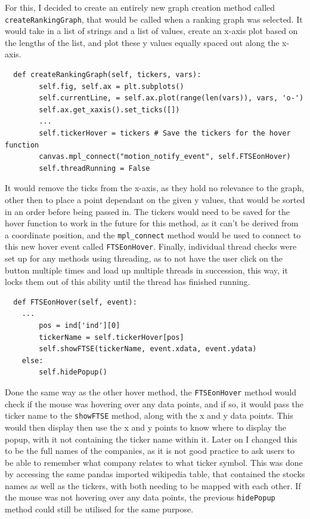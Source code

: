 \documentclass{article}
\begin{document}
For this, I decided to create an entirely new graph creation method called \texttt{createRankingGraph}, that would be called when a ranking graph was selected. It would take in a list of strings and a list of values, create an x-axis plot based on the lengths of the list, and plot these y values equally spaced out along the x-axis.\\\vspace{0.3cm}

\begin{verbatim}
  def createRankingGraph(self, tickers, vars):
        self.fig, self.ax = plt.subplots()
        self.currentLine, = self.ax.plot(range(len(vars)), vars, 'o-')
        self.ax.get_xaxis().set_ticks([])
        ...
        self.tickerHover = tickers # Save the tickers for the hover function
        canvas.mpl_connect("motion_notify_event", self.FTSEonHover)
        self.threadRunning = False
\end{verbatim}

\vspace{0.3cm}
It would remove the ticks from the x-axis, as they hold no relevance to the graph, other then to place a point dependant on the given y values, that would be sorted in an order before being passed in. The tickers would need to be saved for the hover function to work in the future for this method, as it can't be derived from a coordinate position, and the \texttt{mpl\_connect} method would be used to connect to this new hover event called \texttt{FTSEonHover}. Finally, individual thread checks were set up for any methods using threading, as to not have the user click on the button multiple times and load up multiple threads in succession, this way, it locks them out of this ability until the thread has finished running.\\\vspace{0.3cm}

\begin{verbatim}
  def FTSEonHover(self, event):
    ...
        pos = ind['ind'][0]
        tickerName = self.tickerHover[pos]
        self.showFTSE(tickerName, event.xdata, event.ydata)
    else:
        self.hidePopup()
\end{verbatim}

\vspace{0.3cm}
Done the same way as the other hover method, the \texttt{FTSEonHover} method would check if the mouse was hovering over any data points, and if so, it would pass the ticker name to the \texttt{showFTSE} method, along with the x and y data points. This would then display then use the x and y points to know where to display the popup, with it not containing the ticker name within it. Later on I changed this to be the full names of the companies, as it is not good practice to ask users to be able to remember what company relates to what ticker symbol. This was done by accessing the same pandas imported wikipedia table, that contained the stocks names as well as the tickers, with both needing to be mapped with each other. If the mouse was not hovering over any data points, the previous \texttt{hidePopup} method could still be utilised for the same purpose.\\\vspace{0.3cm}
\end{document}
